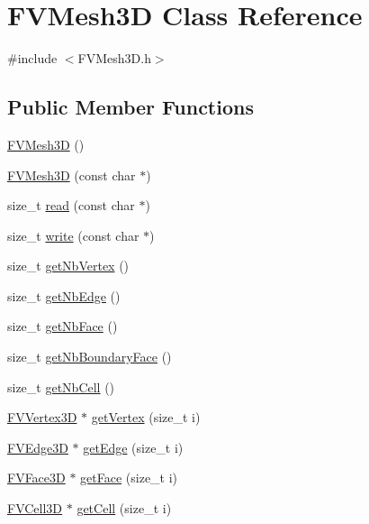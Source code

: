 \hypertarget{classFVMesh3D}{
\section{FVMesh3D Class Reference}
\label{d1/d3c/classFVMesh3D}
}


{\ttfamily \#include $<$FVMesh3D.h$>$}

\subsection*{Public Member Functions}
\begin{DoxyCompactItemize}
\item 
\hyperlink{classFVMesh3D_a1553aada58e2ba7bed740ec7af9a2e58}{FVMesh3D} ()
\item 
\hyperlink{classFVMesh3D_afaea51bb84ddd9df56b23d2743a1b10f}{FVMesh3D} (const char $\ast$)
\item 
size\_\-t \hyperlink{classFVMesh3D_a25c8ba5048b8d53613b14c9e0f0e4a34}{read} (const char $\ast$)
\item 
size\_\-t \hyperlink{classFVMesh3D_a4afe5a96e4659fea7ca076ddf1da3620}{write} (const char $\ast$)
\item 
size\_\-t \hyperlink{classFVMesh3D_a8197b8765302aecf9e815d0a29e14a8d}{getNbVertex} ()
\item 
size\_\-t \hyperlink{classFVMesh3D_a08dfee0bb433dbc6b3eaa1e0bd371b67}{getNbEdge} ()
\item 
size\_\-t \hyperlink{classFVMesh3D_a09510dd5af89d68d9af6968319250646}{getNbFace} ()
\item 
size\_\-t \hyperlink{classFVMesh3D_ad8a90be68e89ed1f8b4718127ad0b1c8}{getNbBoundaryFace} ()
\item 
size\_\-t \hyperlink{classFVMesh3D_a64ae6d6814ef01f53f6fd2f2f9ff8a0c}{getNbCell} ()
\item 
\hyperlink{classFVVertex3D}{FVVertex3D} $\ast$ \hyperlink{classFVMesh3D_acc8e683f93de8a8d737326165d071b87}{getVertex} (size\_\-t i)
\item 
\hyperlink{classFVEdge3D}{FVEdge3D} $\ast$ \hyperlink{classFVMesh3D_a020aa5783ac3bc4f77d8e0a9e9ba227b}{getEdge} (size\_\-t i)
\item 
\hyperlink{classFVFace3D}{FVFace3D} $\ast$ \hyperlink{classFVMesh3D_a4b62bc380931f2a591db5c1951f8e257}{getFace} (size\_\-t i)
\item 
\hyperlink{classFVCell3D}{FVCell3D} $\ast$ \hyperlink{classFVMesh3D_ab43ab85279142a63c72c87ea778a8e2e}{getCell} (size\_\-t i)
\item 

\end{DoxyCompactItemize}
